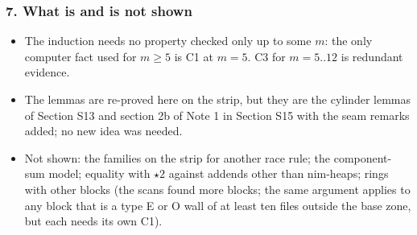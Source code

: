 \subsubsection*{7. What is and is not shown}
\begin{itemize}
\item The induction needs no property checked only up to some $m$: the only computer fact used for $m\ge5$ is C1 at $m=5$. C3 for $m=5..12$ is redundant evidence.
\item The lemmas are re-proved here on the strip, but they are the cylinder lemmas of Section S13 and section 2b of Note 1 in Section S15 with the seam remarks added; no new idea was needed.
\item Not shown: the families on the strip for another race rule; the component-sum model; equality with $\star2$ against addends other than nim-heaps; rings with other blocks (the scans found more blocks; the same argument applies to any block that is a type E or O wall of at least ten files outside the base zone, but each needs its own C1).
\end{itemize}
